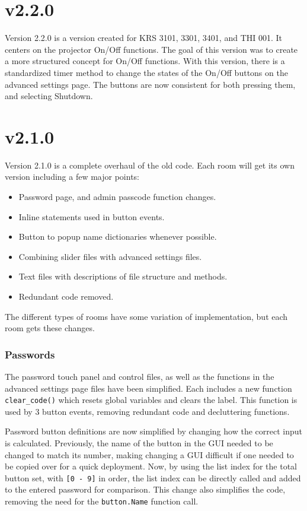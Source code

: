 \documentclass{article}
\begin{document}
\section*{v2.2.0}

Version 2.2.0 is a version created for KRS 3101, 3301, 3401, and THI 001. It centers on the projector On/Off functions. 
The goal of this version was to create a more structured concept for On/Off functions. With this version, there is a 
standardized timer method to change the states of the On/Off buttons on the advanced settings page. The buttons are 
now consistent for both pressing them, and selecting Shutdown. 

\section*{v2.1.0}

Version 2.1.0 is a complete overhaul of the old code. Each room will get its own version including a few major points:

\begin{itemize}
    \item Password page, and admin passcode function changes.
    \item Inline statements used in button events. 
    \item Button to popup name dictionaries whenever possible.
    \item Combining slider files with advanced settings files.
    \item Text files with descriptions of file structure and methods. 
    \item Redundant code removed.
\end{itemize}

The different types of rooms have some variation of implementation, but each room gets these changes. 

\subsubsection*{Passwords}

The password touch panel and control files, as well as the functions in the advanced settings page files have been simplified.
Each includes a new function \lstinline|clear_code()| which resets global variables and clears the label. This function is 
used by 3 button events, removing redundant code and decluttering functions. 

Password button definitions are now simplified by changing how the correct input is calculated. Previously, the name of the 
button in the GUI needed to be changed to match its number, making changing a GUI difficult if one needed to be copied over
for a quick deployment. Now, by using the list index for the total button set, with \lstinline|[0 - 9]| in order, the list 
index can be directly called and added to the entered password for comparison. This change also simplifies the code, removing
the need for the \lstinline|button.Name| function call. 
\end{document}
